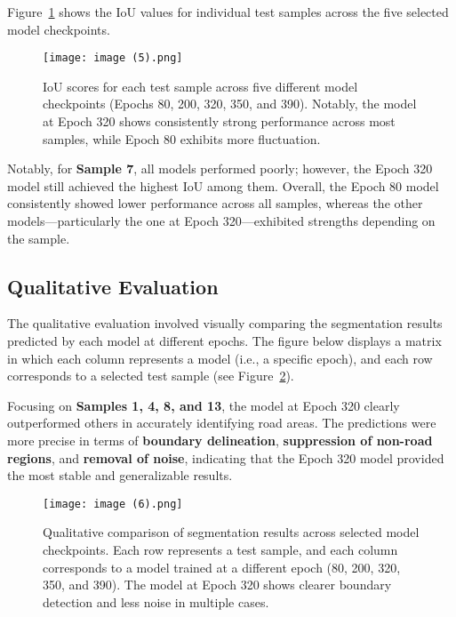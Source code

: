 \documentclass{article}
\begin{document}
Figure~\ref{fig:samplewise_iou} shows the IoU values for individual test samples across the five selected model checkpoints.

\begin{figure}[t]
  \centering
  \texttt{[image: image (5).png]}
  \caption{IoU scores for each test sample across five different model checkpoints (Epochs 80, 200, 320, 350, and 390). Notably, the model at Epoch 320 shows consistently strong performance across most samples, while Epoch 80 exhibits more fluctuation.}
  \label{fig:samplewise_iou}
\end{figure}


Notably, for \textbf{Sample 7}, all models performed poorly; however, the Epoch 320 model still achieved the highest IoU among them. Overall, the Epoch 80 model consistently showed lower performance across all samples, whereas the other models---particularly the one at Epoch 320---exhibited strengths depending on the sample.

\subsection{Qualitative Evaluation}

The qualitative evaluation involved visually comparing the segmentation results predicted by each model at different epochs. The figure below displays a matrix in which each column represents a model (i.e., a specific epoch), and each row corresponds to a selected test sample (see Figure~\ref{fig:qualitative_results}).

Focusing on \textbf{Samples 1, 4, 8, and 13}, the model at Epoch 320 clearly outperformed others in accurately identifying road areas. The predictions were more precise in terms of \textbf{boundary delineation}, \textbf{suppression of non-road regions}, and \textbf{removal of noise}, indicating that the Epoch 320 model provided the most stable and generalizable results.

\begin{figure}[t]
  \centering
  \texttt{[image: image (6).png]}
  \caption{Qualitative comparison of segmentation results across selected model checkpoints. Each row represents a test sample, and each column corresponds to a model trained at a different epoch (80, 200, 320, 350, and 390). The model at Epoch 320 shows clearer boundary detection and less noise in multiple cases.}
  \label{fig:qualitative_results}
\end{figure}
\end{document}
